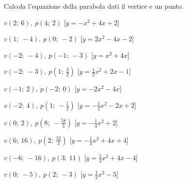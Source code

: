 \begin{esercizio}\label{ese:}
 Calcola l'equazione della parabola dati il vertice e un punto.
 \begin{enumeratea}
  \item  $v \left (2;~6 \right ),~p \left (4;~2 \right )$
   \hfill [$y=- x^2 +4 x +2$]
  \item  $v \left (1;~-4 \right ),~p \left (0;~-2 \right )$
   \hfill [$y=2 x^2 -4 x -2$]
  \item  $v \left (-2;~-4 \right ),~p \left (-1;~-3 \right )$
   \hfill [$y=x^2 +4 x $]
  \item  $v \left (-2;~-3 \right ),~p \left (1;~\frac{3}{2} \right )$
   \hfill [$y=\frac{1}{2} x^2 +2 x -1$]
  \item  $v \left (-1;~2 \right ),~p \left (-2;~0 \right )$
   \hfill [$y=-2 x^2 -4 x $]
  \item  $v \left (-2;~4 \right ),~p \left (1;~-\frac{1}{2} \right )$
   \hfill [$y=-\frac{1}{2} x^2 -2 x +2$]
  \item  $v \left (0;~2 \right ),~p \left (8;~-\frac{58}{3} \right )$
   \hfill [$y=-\frac{1}{3} x^2 +2$]
  \item  $v \left (6;~16 \right ),~p \left (2;~\frac{32}{3} \right )$
   \hfill [$y=-\frac{1}{3} x^2 +4 x +4$]
  \item  $v \left (-6;~-16 \right ),~p \left (3;~11 \right )$
   \hfill [$y=\frac{1}{3} x^2 +4 x -4$]
  \item  $v \left (0;~-5 \right ),~p \left (2;~-3 \right )$
   \hfill [$y=\frac{1}{2} x^2 -5$]
 \end{enumeratea}
\end{esercizio}

